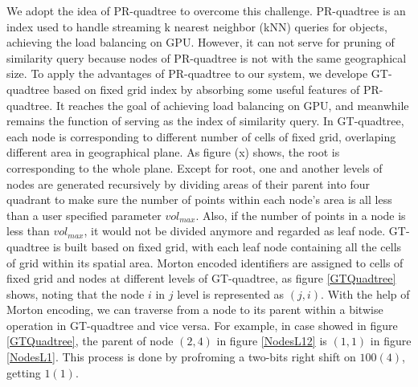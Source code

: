 \documentclass[conference]{IEEEtran}
\begin{document}
We adopt the idea of PR-quadtree\cite{DBLP:conf/gis/LettichOS15} to overcome this challenge. PR-quadtree is an index used to handle streaming k nearest neighbor (kNN) queries for objects, achieving the load balancing on GPU. However, it can not serve for pruning of similarity query because nodes of PR-quadtree is not with the same geographical size. To apply the advantages of PR-quadtree to our system, we develope GT-quadtree based on fixed grid index by absorbing some useful features of PR-quadtree. It reaches the goal of achieving load balancing on GPU, and meanwhile remains the function of serving as the index of similarity query. In GT-quadtree, each node is corresponding to different number of cells of fixed grid, overlaping different area in geographical plane. As figure (x) shows, %
%
%
the root is corresponding to the whole plane. Except for root, one and another levels of nodes are generated recursively by dividing areas of their parent into four quadrant to make sure the number of points within each node's area is all less than a user specified parameter $vol_{max}$. Also, if the number of points in a node is less than $vol_{max}$, it would not be divided anymore and regarded as leaf node. GT-quadtree is built based on fixed grid, with each leaf node containing all the cells of grid within its spatial area. Morton encoded identifiers are assigned to cells of fixed grid and nodes at different levels of GT-quadtree, as figure \ref{GTQuadtree} shows, noting that the node $i$ in $j$ level is represented as $(j,i)$. With the help of Morton encoding, we can traverse from a node to its parent within a bitwise operation in GT-quadtree and vice versa. For example, in case showed in figure \ref{GTQuadtree}, the parent of node $(2,4)$ in figure \ref{NodesL12} is $(1,1)$ in figure \ref{NodesL1}. This process is done by profroming a two-bits right shift on $100(4)$, getting $1(1)$. 

\end{document}
